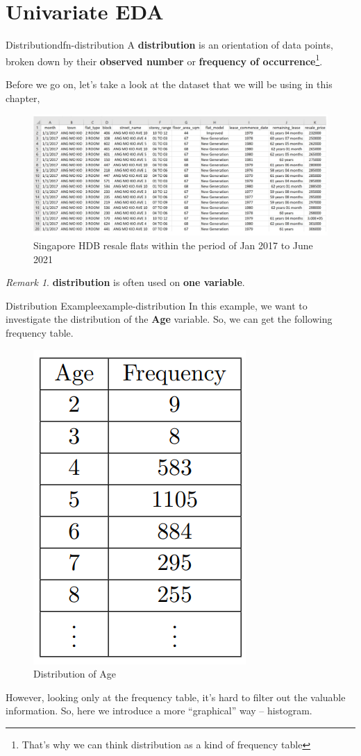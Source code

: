 \documentclass[math,code]{amznotes}
\theoremstyle{remark}
\newtheorem*{remark}{Remark}
\begin{document}
\section{Univariate EDA}
\begin{dfnbox}{Distribution}{dfn-distribution}
    A {\color{red} \textbf{distribution}} is an orientation of data points, broken down by their \textbf{observed number} or \textbf{frequency of occurrence}\footnote{That's why we can think distribution as a kind of frequency table}.
\end{dfnbox}
Before we go on, let's take a look at the dataset that we will be using in this chapter,
\begin{figure}[H]
    \centering
    \includegraphics[width=0.75\linewidth]{images/chapter3-dataset-excel.png}
    \caption{Singapore HDB resale flats within the period of Jan 2017 to June 2021}
    \label{fig:chapter3-dataset}
\end{figure}
\begin{notebox}
    \begin{remark}
        \textbf{distribution} is often used on \textbf{one variable}.
    \end{remark}
\end{notebox}
\begin{exbox}{Distribution Example}{example-distribution}
    In this example, we want to investigate the distribution of the \textbf{Age} variable. So, we can get the following frequency table.
    \begin{figure}[H]
        \centering
        \includegraphics[width=0.15\linewidth]{images/chapter3-distribution-example.png}
        \caption{Distribution of Age}
        \label{fig:chapter3-distribution-example}
    \end{figure}
\end{exbox}
However, looking only at the frequency table, it's hard to filter out the valuable information. So, here we introduce a more ``graphical'' way -- histogram.
\end{document}
